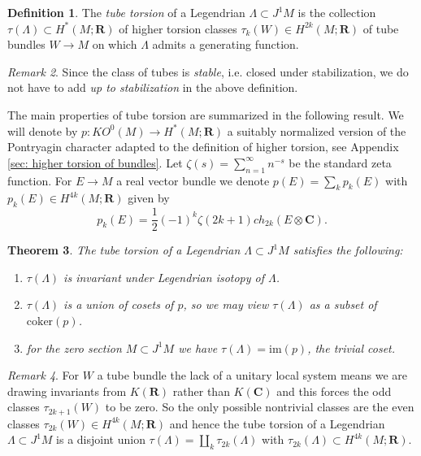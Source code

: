 \documentclass{amsart}
\def\bC{\mathbf{C}}
\def\bR{\mathbf{R}}
\newtheorem{theorem}{Theorem}[section]
\theoremstyle{definition}
\newtheorem{definition}[theorem]{Definition}
\theoremstyle{remark}
\newtheorem{inductive lemma}[theorem]{Inductive Lemma}
\newtheorem{remark}[theorem]{Remark}
\begin{document}
 
 \begin{definition}\label{def: higher whitehead}
The {\em tube torsion} of a Legendrian $\Lambda \subset J^1M$ is the collection $\tau(\Lambda) \subset H^*(M;\bR)$ of higher torsion classes $\tau_k(W) \in H^{2k}(M;\bR)$ of tube bundles $W \to M$ on which $\Lambda$ admits a generating function. 
 \end{definition}
 
 \begin{remark} Since the class of tubes is {\em stable}, i.e. closed under stabilization, we do not have to add {\em up to stabilization} in the above definition.  \end{remark}
 
The main properties of tube torsion are summarized in the following result. We will denote by $p:KO^0(M) \to H^*(M;\bR)$ a suitably normalized version of the Pontryagin character adapted to the definition of higher torsion, see Appendix \ref{sec: higher torsion of bundles}. Let $\zeta(s)=\sum_{n=1}^\infty n^{-s}$ be the standard zeta function. For $E \to M$ a real vector bundle we denote $p(E)=\sum_k p_k(E)$ with $p_k(E) \in H^{4k}(M;\bR)$ given by 
$$p_k(E) = \frac{1}{2} (-1)^k \zeta(2k+1) ch_{2k}(E \otimes \bC) .$$
 
   \begin{theorem}\label{thm: main 1}
The tube torsion of a Legendrian $\Lambda \subset J^1M$ satisfies the following:
 \begin{enumerate}
 \item\label{item: Leg-inv} $\tau(\Lambda)$  is invariant under Legendrian isotopy of $\Lambda$.
   \item\label{item: coset}  $\tau(\Lambda) $ is a union of cosets of $p$, so we may view $\tau(\Lambda)$ as a subset of $\text{coker}(p)$. 
 \item\label{item: zero-sec triv} for the zero section $M \subset J^1M $ we have $\tau(\Lambda) =\text{im}(p)$, the trivial coset.
 \end{enumerate}
 \end{theorem}
 
 \begin{remark}
For $W$ a tube bundle the lack of a unitary local system means we are drawing invariants from $K(\bR)$ rather than $K(\bC)$ and this forces the odd classes $\tau_{2k+1}(W)$ to be zero. So the only possible nontrivial classes are the even classes $\tau_{2k}(W) \in H^{4k}(M;\bR)$ and hence the tube torsion of a Legendrian $\Lambda \subset J^1M$ is a disjoint union $\tau(\Lambda) = \coprod_k \tau_{2k}(\Lambda)$ with $\tau_{2k}(\Lambda) \subset H^{4k}(M;\bR)$. 
 \end{remark}
 
\end{document}
